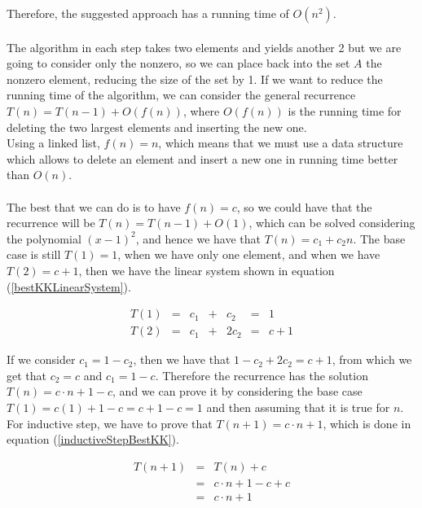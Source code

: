 \documentclass[tikz, 12pt]{scrartcl}
\begin{document}
Therefore, the suggested approach has a running time of $O(n^2)$.\\
\\
The algorithm in each step takes two elements and yields another 2 but we are going to consider only the nonzero, so we can place back into the set $A$ the nonzero element, reducing the size of the set by 1. If we want to reduce the running time of the algorithm, we can consider the general recurrence $T(n) = T(n - 1) + O(f(n))$, where $O(f(n))$ is the running time for deleting the two largest elements and inserting the new one. \\
Using a linked list, $f(n) = n$, which means that we must use a data structure which allows to delete an element and insert a new one in running time better than $O(n)$.\\
\\
The best that we can do is to have $f(n) = c$, so we could have that the recurrence will be $T(n) = T(n - 1) + O(1)$, which can be solved considering the polynomial $(x-1)^2$, and hence we have that $T(n) = c_1 + c_2 n$. The base case is still $T(1) = 1$, when we have only one element, and when we have $T(2) = c + 1$, then we have the linear system shown in equation (\ref{bestKKLinearSystem}).

\begin{equation}\label{bestKKLinearSystem}
\begin{array}{ccccccl}
T(1)	&	=	&	c_1 &	+	& 	c_2 	&	=	&	1\\
T(2)	&	=	&	c_1	&	+	&	2c_2	&	=	&	c +1
\end{array}
\end{equation}

If we consider $c_1 = 1 - c_2$, then we have that $1 - c_2 + 2 c_2= c + 1$, from which we get that $c_2 = c$ and $c_1 = 1 - c$. Therefore the recurrence has the solution $T(n) = c \cdot n + 1 - c$, and we can prove it by considering the base case $T(1) = c(1) + 1 - c = c + 1 - c = 1$ and then assuming that it is true for $n$. For inductive step, we have to prove that $T(n + 1) = c \cdot n + 1$, which is done in equation (\ref{inductiveStepBestKK}).

\begin{equation}\label{inductiveStepBestKK}
\begin{array}{ccc}
T(n + 1)	&	=	&	T(n) + c \\
			&	=	&	c \cdot n + 1 - c + c \\
			&	=	&	c \cdot n + 1
\end{array}
\end{equation}
\end{document}
